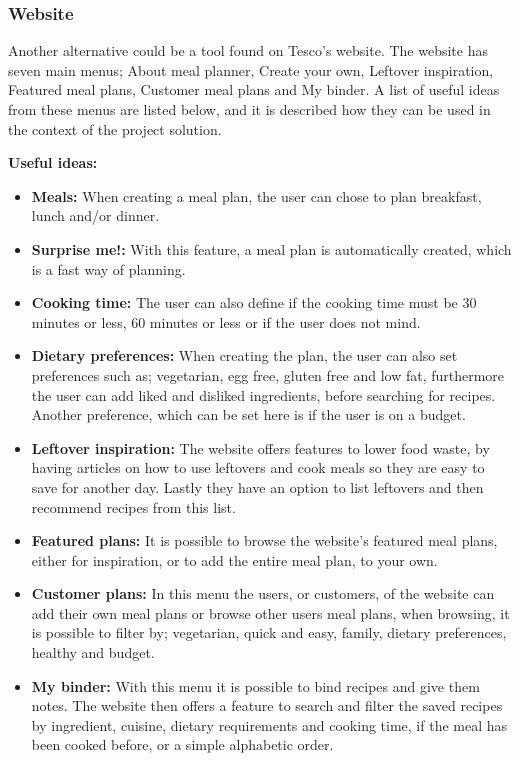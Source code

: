 \subsubsection{Website}
Another alternative could be a tool found on Tesco's website\cite{tesco_foodplan}. The website has seven main menus; About meal planner, Create your own, Leftover inspiration, Featured meal plans, Customer meal plans and My binder. A list of useful ideas from these menus are listed below, and it is described how they can be used in the context of the project solution.

\textbf{Useful ideas:}
\begin{itemize}
  \item \textbf{Meals:} When creating a meal plan, the user can chose to plan breakfast, lunch and/or dinner.
  \item \textbf{Surprise me!:} With this feature, a meal plan is automatically created, which is a fast way of planning.
  \item \textbf{Cooking time:} The user can also define if the cooking time must be 30 minutes or less, 60 minutes or less or if the user does not mind.
  \item \textbf{Dietary preferences:} When creating the plan, the user can also set preferences such as; vegetarian, egg free, gluten free and low fat, furthermore the user can add liked and disliked ingredients, before searching for recipes. Another preference, which can be set here is if the user is on a budget.
  \item \textbf{Leftover inspiration:} The website offers features to lower food waste, by having articles on how to use leftovers and cook meals so they are easy to save for another day. Lastly they have an option to list leftovers and then recommend recipes from this list.
  \item \textbf{Featured plans:} It is possible to browse the website's featured meal plans, either for inspiration, or to add the entire meal plan, to your own.
  \item \textbf{Customer plans:} In this menu the users, or customers, of the website can add their own meal plans or browse other users meal plans, when browsing, it is possible to filter by; vegetarian, quick and easy, family, dietary preferences, healthy and budget.
  \item \textbf{My binder:} With this menu it is possible to bind recipes and give them notes. The website then offers a feature to search and filter the saved recipes by ingredient, cuisine, dietary requirements and cooking time, if the meal has been cooked before, or a simple alphabetic order.
\end{itemize}

